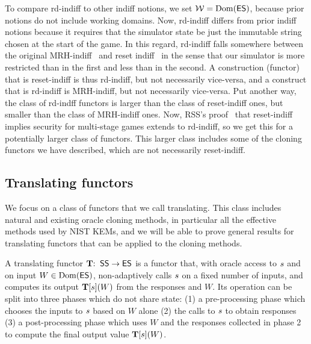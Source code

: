

 To compare rd-indiff to other indiff notions, we set ${\cal W} = \mathrm{Dom}(\mathsf{ES})$, because prior notions do not include working domains. Now, rd-indiff differs from prior indiff notions because it requires that the simulator state be just the immutable string chosen at the start of the game. In this regard, rd-indiff falls somewhere between the original MRH-indiff~\cite{TCC:MauRenHol04} and reset indiff~\cite{EC:RisShaShr11} in the sense that our simulator is more restricted than in the first and less than in the second. A construction (functor) that is reset-indiff is thus rd-indiff, but not necessarily vice-versa, and a construct that is rd-indiff is MRH-indiff, but not necessarily vice-versa. Put another way, the class of rd-indff functors is larger than the class of reset-indiff ones, but smaller than the class of MRH-indiff ones. Now, RSS's proof~\cite{EC:RisShaShr11} that reset-indiff implies security for multi-stage games extends to rd-indiff, so we get this for a potentially larger class of functors. This larger class includes some of the cloning functors we have described, which are not necessarily reset-indiff.

\subsection{Translating functors}

 We focus on a class of functors that we call translating. This class includes natural and existing oracle cloning methods, in particular all the effective methods used by NIST KEMs, and we will be able to prove general results for translating functors that can be applied to the cloning methods. 

A translating functor $\mathbf{T} {:\;\;} \mathsf{SS}\to \mathsf{ES}$ is a functor that, with oracle access to $s$ and on input $W \in\mathrm{Dom}(\mathsf{ES})$, non-adaptively calls $s$ on a fixed number of inputs, and computes its output $\mathbf{T}[s](W)$ from the responses and $W$. Its operation can be split into three phases which do not share state: (1) a pre-processing phase which chooses the inputs to $\mathit{s}$ based on $W$ alone (2) the calls to $\mathit{s}$ to obtain responses (3) a post-processing phase which uses $W$ and the responses collected in phase 2 to compute the final output value $\mathbf{T}[s](W)$.

